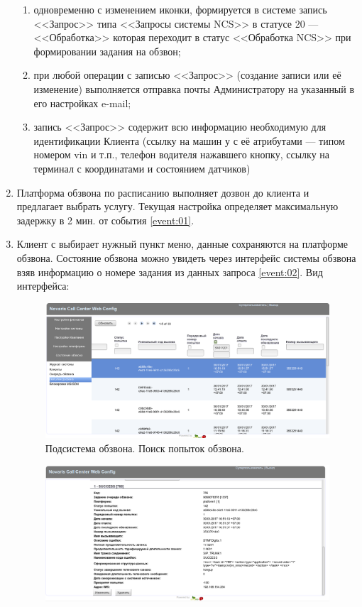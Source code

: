 \documentclass[russian,utf8,12pt,emptystyle]{eskdtext}
\begin{document}
\begin{enumerate}
\begin{enumerate}
\item одновременно с изменением иконки, формируется в системе запись <<Запрос>> типа <<Запросы системы NCS>> в статусе 20 --- <<Обработка>> которая переходит в статус <<Обработка NCS>> при формировании задания на обзвон;
\item при любой операции с записью <<Запрос>> (создание записи или её изменение) выполняется отправка почты Администратору на указанный в его настройках e-mail;
\item запись <<Запрос>> содержит всю информацию необходимую для идентификации Клиента (ссылку на машин у с её атрибутами --- типом номером vin и т.п., телефон водителя нажавшего кнопку, ссылку на терминал с координатами и состоянием датчиков)
\end{enumerate}
\item Платформа обзвона по расписанию выполняет дозвон до клиента и предлагает выбрать услугу. Текущая настройка определяет максимальную задержку в 2 мин. от события \ref{event:01}.
\item Клиент с выбирает нужный пункт меню, данные сохраняются на платформе обзвона. Состояние обзвона можно увидеть через интерфейс системы обзвона взяв информацию о номере задания из данных запроса \ref{event:02}. Вид интерфейса:
\begin{figure}[h]
\begin{center}
\includegraphics[width=0.9\linewidth]{ncs01}
\end{center}
\caption{Подсистема обзвона. Поиск попыток обзвона.}
\label{ris:ncs01}
\end{figure}
\begin{figure}[h]
\begin{center}
\includegraphics[width=0.9\linewidth]{ncs02}

\end{center}
\end{figure}
\end{enumerate}
\end{document}
